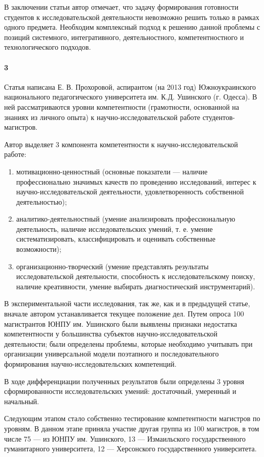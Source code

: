 \documentclass[oneside]{scrartcl}
\begin{document}
В заключении статьи автор отмечает, что задачу формирования готовности студентов к исследовательской деятельности невозможно
решить только в рамках одного предмета. Необходим комплексный подход к решению данной проблемы с позиций системного,
интегративного, деятельностного, компетентностного и технологического подходов.

\paragraph{3}
Статья \cite{prohorova} написана Е. В. Прохоровой, аспирантом (на 2013 год) Южноукраинского национального педагогического
университета им. К.Д. Ушинского (г. Одесса). В ней рассматриваются уровни компетентности (грамотности, основанной на знаниях
из личного опыта) к научно-исследовательской работе студентов-магистров.

Автор выделяет 3 компонента компетентности к научно-исследовательской работе:
\begin{enumerate}[1)]
\item мотивационно-ценностный (основные показатели --- наличие профессионально значимых качеств по проведению исследований,
интерес к научно-исследовательской деятельности, удовлетворенность собственной деятельностью);
\item аналитико-деятельностный (умение анализировать профессиональную деятельность, наличие исследовательских умений,
т. е. умение систематизировать, классифицировать и оценивать собственные возможности);
\item организационно-творческий (умение представлять результаты исследовательской деятельности, способность к исследовательскому
поиску, наличие креативности, умение выбирать диагностический инструментарий).
\end{enumerate}

В экспериментальной части исследования, так же, как и в предыдущей статье, вначале автором устанавливается текущее положение дел.
Путем опроса 100 магистрантов ЮНПУ им. Ушинского были выявлены признаки недостатка компетентности у большинства субъектов
научно-исследовательской деятельности; были определены проблемы, которые необходимо учитывать при организации универсальной 
модели поэтапного и последовательного формирования научно-исследовательских компетенций.

В ходе дифференциации полученных результатов были определены 3 уровня сформированности исследовательских умений:
достаточный, умеренный и начальный.

Следующим этапом стало собственно тестирование компетентности магистров по уровням. В данном этапе приняла участие другая группа
из 100 магистров, в том числе 75 --- из ЮНПУ им. Ушинского, 13 --- Измаильского государственного гуманитарного университета,
12 --- Херсонского государственного университета.
\end{document}
